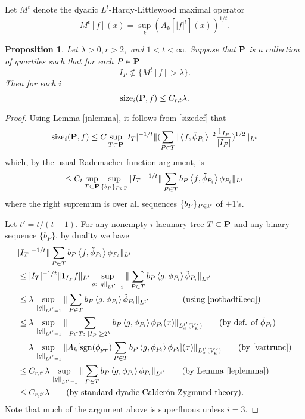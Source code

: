 \documentclass[12pt]{amsart}
\numberwithin{equation}{section}
\def\P{{\bf P}}
\def\<{\left<}
\def\>{\right>}
\newcommand {\size}{\mathrm{size}}
\newcommand {\sgn}{\mathop{\mathrm{sgn}}}
\newcommand {\tphi}{\tilde{\phi}}
\newtheorem{proposition}[theorem]{Proposition}
\begin{document}
Let $M^t$ denote the dyadic $L^t$-Hardy-Littlewood maximal operator
\begin{equation}\label{e.dyadicHL}
M^t[f](x) = \sup_k (A_k[|f|^t](x))^{1/t}.
\end{equation}

\begin{proposition} \label{propositionvnsb}
Let $\lambda > 0, r > 2,$ and $1 < t < \infty$. Suppose that $\P$ is a collection of quartiles such that for each $P \in \P$
\begin{equation} \label{notbadtileeq}
I_P \not\subset \{M^t[f] > \lambda\}.
\end{equation}
Then for each $i$
\[
\size_i(\P,f) \leq C_{r,t} \lambda.
\]
\end{proposition}

\begin{proof}
Using Lemma \ref{jnlemma}, it follows from \eqref{sizedef} that
\[
\size_i(\P,f) \leq C \sup_{T \subset \P} |I_T|^{-1/t} \|(\sum_{P \in T}|\<f,\tphi_{P_i}\>|^2\frac{1_{I_P}}{|I_P|})^{1/2}\|_{L^t}
\]
which, by the usual Rademacher function argument, is
\[
\leq C_t \sup_{T \subset \P} \sup_{\{b_P\}_{P \in \P}}|I_T|^{-1/t} \|\sum_{P \in T} b_P \<f,\tphi_{P_i}\> \phi_{P_i} \|_{L^t}
\]
where the right supremum is over all sequences $\{b_P\}_{P \in \P}$ of $\pm1$'s.

Let $t' = t/(t - 1)$. For any nonempty $i$-lacunary tree $T\subset \P$ and any binary sequence $\{b_P\}$, by duality we have
\begin{align*}
&|I_T|^{-1/t} \|\sum_{P \in T} b_P \<f,\tphi_{P_i}\> \phi_{P_i} \|_{L^t} \\
&\leq |I_T|^{-1/t} \|1_{I_T}f\|_{L^t} \sup_{g : \|g\|_{L^{t'} = 1}} \|\sum_{P \in T} b_P \<g,\phi_{P_i}\> \tphi_{P_i} \|_{L^{t'}}  \\
&\leq \lambda \sup_{\|g\|_{L^{t'} = 1}} \|\sum_{P \in T} b_P \<g,\phi_{P_i}\> \tphi_{P_i} \|_{L^{t'}}   \qquad \qquad \text{(using \eqref{notbadtileeq})} \\
&\leq \lambda \sup_{\|g\|_{L^{t'} = 1}} \|\sum_{P \in T: \,\, |I_P| \geq 2^k} b_P \<g,\phi_{P_i}\> \phi_{P_i}(x) \|_{L^{t'}_x(V^r_k)} \qquad \text{(by def. of $\tphi_{P_i}$)}\\
&= \lambda \sup_{\|g\|_{L^{t'} = 1}} \|A_k[\sgn(\phi_{p_T})\sum_{P \in T} b_P \<g,\phi_{P_i}\> \phi_{P_i}](x) \|_{L^{t'}_x(V^r_k)}  \qquad \text{(by \eqref{vartrunc})} \\
&\leq C_{r,t'}\lambda \sup_{\|g\|_{L^{t'} = 1}} \|\sum_{P \in T} b_P \<g,\phi_{P_i}\> \phi_{P_i}\|_{L^{t'}}  \qquad \text{(by Lemma \ref{leplemma})} \\
&\leq C_{r,t'} \lambda \qquad \text{(by standard dyadic Calder\'{o}n-Zygmund theory).} 
\end{align*}
Note that much of the argument above is superfluous unless $i=3$.
\end{proof}
\end{document}
